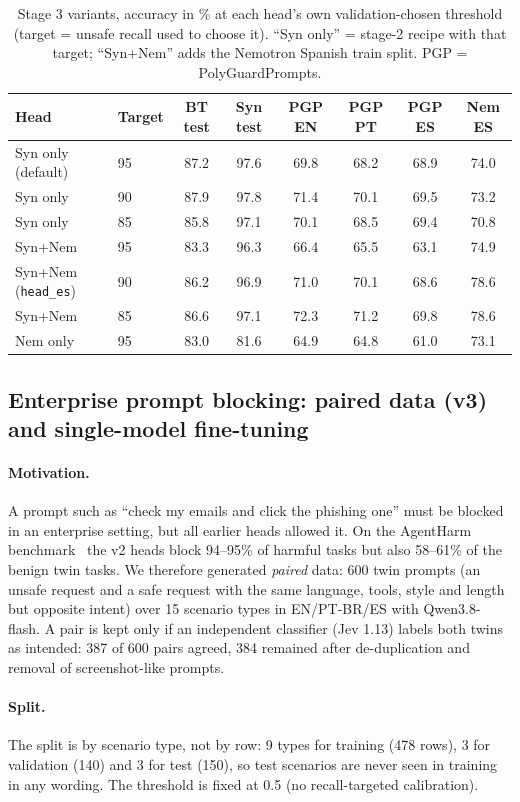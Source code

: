 \documentclass[conference]{IEEEtran}
\begin{document}
\begin{table}[t]
\caption{Stage 3 variants, accuracy in \% at each head's own validation-chosen threshold (target = unsafe recall used to choose it). ``Syn only'' = stage-2 recipe with that target; ``Syn+Nem'' adds the Nemotron Spanish train split. PGP = PolyGuardPrompts.}\label{tab:s3}
\centering\small
\begin{tabular}{llcccccc}
\toprule
Head & Target & BT test & Syn test & PGP EN & PGP PT & PGP ES & Nem ES\\
\midrule
Syn only (default) & 95 & 87.2 & 97.6 & 69.8 & 68.2 & 68.9 & 74.0\\
Syn only & 90 & 87.9 & 97.8 & 71.4 & 70.1 & 69.5 & 73.2\\
Syn only & 85 & 85.8 & 97.1 & 70.1 & 68.5 & 69.4 & 70.8\\
Syn+Nem & 95 & 83.3 & 96.3 & 66.4 & 65.5 & 63.1 & 74.9\\
Syn+Nem (\texttt{head\_es}) & 90 & 86.2 & 96.9 & 71.0 & 70.1 & 68.6 & 78.6\\
Syn+Nem & 85 & 86.6 & 97.1 & 72.3 & 71.2 & 69.8 & 78.6\\
Nem only & 95 & 83.0 & 81.6 & 64.9 & 64.8 & 61.0 & 73.1\\
\bottomrule
\end{tabular}
\end{table}

\subsection{Enterprise prompt blocking: paired data (v3) and single-model fine-tuning}\label{sec:v3}
\paragraph{Motivation.} A prompt such as ``check my emails and click the phishing one'' must be blocked in an enterprise setting, but all earlier heads allowed it. On the AgentHarm benchmark~\cite{andriushchenko2024agentharm} the v2 heads block 94--95\% of harmful tasks but also 58--61\% of the benign twin tasks. We therefore generated \emph{paired} data: 600 twin prompts (an unsafe request and a safe request with the same language, tools, style and length but opposite intent) over 15 scenario types in EN/PT-BR/ES with Qwen3.8-flash. A pair is kept only if an independent classifier (Jev 1.13) labels both twins as intended: 387 of 600 pairs agreed, 384 remained after de-duplication and removal of screenshot-like prompts.
\paragraph{Split.} The split is by scenario type, not by row: 9 types for training (478 rows), 3 for validation (140) and 3 for test (150), so test scenarios are never seen in training in any wording. The threshold is fixed at 0.5 (no recall-targeted calibration).
\end{document}
